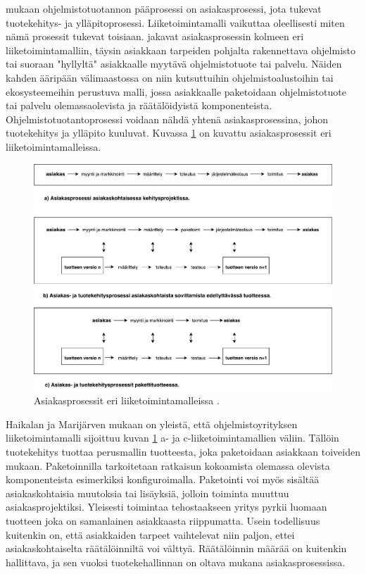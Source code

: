 \documentclass[finnish,12pt,a4paper,pdftex]{article}
\begin{document}
\cite{ohjelmistotuotanto} mukaan ohjelmistotuotannon pääprosessi on asiakasprosessi, jota tukevat tuotekehitys- ja ylläpitoprosessi. Liiketoimintamalli vaikuttaa oleellisesti miten nämä prosessit tukevat toisiaan. \citeauthor{ohjelmistotuotanto} jakavat asiakasprosessin kolmeen eri liiketoimintamalliin, täysin asiakkaan tarpeiden pohjalta rakennettava ohjelmisto tai suoraan "hyllyltä" asiakkaalle myytävä ohjelmistotuote tai palvelu. Näiden kahden ääripään välimaastossa on niin kutsuttuihin ohjelmistoalustoihin tai ekosysteemeihin perustuva malli, jossa asiakkaalle paketoidaan ohjelmistotuote tai palvelu olemassaolevista ja räätälöidyistä komponenteista. Ohjelmistotuotantoprosessi voidaan nähdä yhtenä asiakasprosessina, johon tuotekehitys ja ylläpito kuuluvat. Kuvassa \ref{fig:asiakasprosessi} on kuvattu asiakasprosessit eri liiketoimintamalleissa.

\begin{figure}[!h]
    \centering
    \includegraphics[scale=0.45]{asiakasprosessi.pdf}
    \caption{Asiakasprosessit eri liiketoimintamalleissa \citep{ohjelmistotuotanto}.}
    \label{fig:asiakasprosessi}
\end{figure}

Haikalan ja Marijärven mukaan on yleistä, että ohjelmistoyrityksen liiketoimintamalli sijoittuu kuvan \ref{fig:asiakasprosessi} a- ja c-liiketoimintamallien väliin. Tällöin tuotekehitys tuottaa perusmallin tuotteesta, joka paketoidaan asiakkaan toiveiden mukaan. Paketoinnilla tarkoitetaan ratkaisun kokoamista olemassa olevista komponenteista esimerkiksi konfiguroimalla. Paketointi voi myös sisältää asiakaskohtaisia muutoksia tai lisäyksiä, jolloin toiminta muuttuu asiakasprojektiksi. Yleisesti toimintaa tehostaakseen yritys pyrkii luomaan tuotteen joka on samanlainen asiakkaasta riippumatta. Usein todellisuus kuitenkin on, että asiakkaiden tarpeet vaihtelevat niin paljon, ettei asiakaskohtaiselta räätälöinniltä voi välttyä. Räätälöinnin määrää on kuitenkin hallittava, ja sen vuoksi tuotekehallinnan on oltava mukana asiakasprosessissa.
\end{document}

